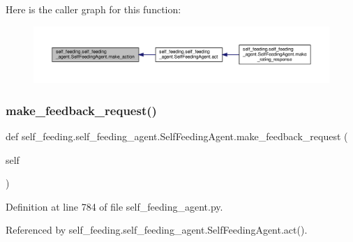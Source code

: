 Here is the caller graph for this function\+:
\nopagebreak
\begin{figure}[H]
\begin{center}
\leavevmode
\includegraphics[width=350pt]{classself__feeding_1_1self__feeding__agent_1_1SelfFeedingAgent_a876feb626f411fd0a18fbce66a886764_icgraph}
\end{center}
\end{figure}
\mbox{\label{classself__feeding_1_1self__feeding__agent_1_1SelfFeedingAgent_abb5225edea055887a8ec2da2d02b7463}} 
\subsubsection{\texorpdfstring{make\+\_\+feedback\+\_\+request()}{make\_feedback\_request()}}
{\footnotesize\ttfamily def self\+\_\+feeding.\+self\+\_\+feeding\+\_\+agent.\+Self\+Feeding\+Agent.\+make\+\_\+feedback\+\_\+request (\begin{DoxyParamCaption}\item[{}]{self }\end{DoxyParamCaption})}



Definition at line 784 of file self\+\_\+feeding\+\_\+agent.\+py.



Referenced by self\+\_\+feeding.\+self\+\_\+feeding\+\_\+agent.\+Self\+Feeding\+Agent.\+act().

